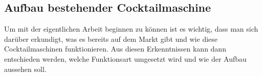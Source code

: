 \subsection{Aufbau bestehender Cocktailmaschine}\label{subsec:Aufbau_bestehender_Cocktailmaschine}

Um mit der eigentlichen Arbeit beginnen zu können ist es wichtig, dass man sich darüber erkundigt, was es bereits auf dem Markt gibt und wie diese Cocktailmaschinen funktionieren. Aus diesen Erkenntnissen kann dann entschieden werden, welche Funktionsart umgesetzt wird und wie der Aufbau aussehen soll.